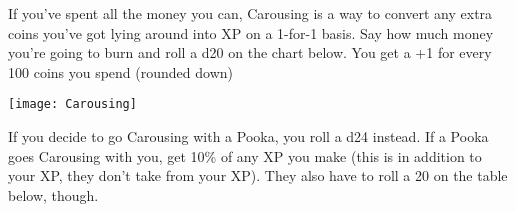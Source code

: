 {

If you've spent all the money you can, Carousing is a way to convert any extra coins you've got lying around into XP on a 1-for-1 basis. Say how much money you're going to burn and roll a d20 on the chart below.  You get a +1 for every 100 coins you spend (rounded down)

    \begin{center}
      \texttt{[image: Carousing]}
    \end{center}


If you decide to go Carousing with a Pooka, you roll a d24 instead.  If a Pooka goes Carousing with you,  get 10\% of any XP you make (this is in addition to your XP, they don't take from your XP).  They also have to roll a 20 on the table below, though.



}
